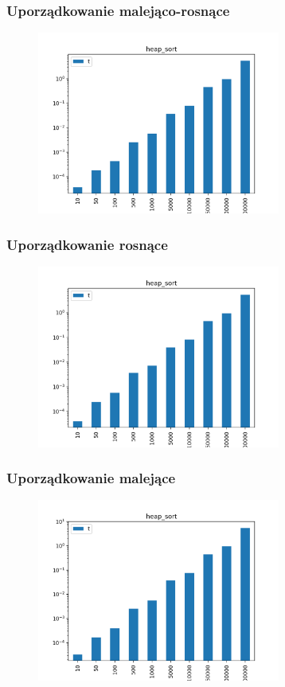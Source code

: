 \documentclass[]{article}
\begin{document}
		\subsubsection{Uporządkowanie malejąco-rosnące}
		\begin{figure}[H]
			\centering
			\includegraphics[width=8cm]{heap_sort_v.png}	
		\end{figure}
		\subsubsection{Uporządkowanie rosnące}
		\begin{figure}[H]
			\centering
			\includegraphics[width=8cm]{heap_sort_g.png}	
		\end{figure}
		\subsubsection{Uporządkowanie malejące}
		\begin{figure}[H]
			\centering
			\includegraphics[width=8cm]{heap_sort_l.png}	
		\end{figure}
\end{document}
